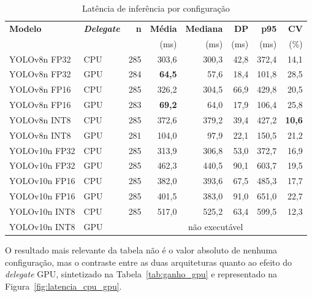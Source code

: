 \documentclass[artigo,times,capa]{iftex2024}
\begin{document}
\begin{table}[H]
\centering
\caption{Latência de inferência por configuração}
\label{tab:latencia_inferencia}
\small
\begin{tabular}{llrrrrrr}
\toprule
\textbf{Modelo} & \textbf{\textit{Delegate}} & \textbf{n} & \textbf{Média} & \textbf{Mediana} & \textbf{DP} & \textbf{p95} & \textbf{CV} \\
 &  &  & (ms) & (ms) & (ms) & (ms) & (\%) \\
\midrule
YOLOv8n \ac{FP32} & \ac{CPU} & 285 & 303,6 & 300,3 & 42,8 & 372,4 & 14,1 \\
YOLOv8n \ac{FP32} & \ac{GPU} & 284 & \textbf{64,5} & 57,6 & 18,4 & 101,8 & 28,5 \\
YOLOv8n \ac{FP16} & \ac{CPU} & 285 & 326,2 & 304,5 & 66,9 & 429,8 & 20,5 \\
YOLOv8n \ac{FP16} & \ac{GPU} & 283 & \textbf{69,2} & 64,0 & 17,9 & 106,4 & 25,8 \\
YOLOv8n \ac{INT8} & \ac{CPU} & 285 & 372,6 & 379,2 & 39,4 & 427,2 & \textbf{10,6} \\
YOLOv8n \ac{INT8} & \ac{GPU} & 281 & 104,0 & 97,9 & 22,1 & 150,5 & 21,2 \\
\midrule
YOLOv10n \ac{FP32} & \ac{CPU} & 285 & 313,9 & 306,8 & 53,0 & 372,7 & 16,9 \\
YOLOv10n \ac{FP32} & \ac{GPU} & 285 & 462,3 & 440,5 & 90,1 & 603,7 & 19,5 \\
YOLOv10n \ac{FP16} & \ac{CPU} & 285 & 382,0 & 393,6 & 67,5 & 485,3 & 17,7 \\
YOLOv10n \ac{FP16} & \ac{GPU} & 285 & 401,5 & 383,0 & 91,0 & 651,0 & 22,7 \\
YOLOv10n \ac{INT8} & \ac{CPU} & 285 & 517,0 & 525,2 & 63,4 & 599,5 & 12,3 \\
YOLOv10n \ac{INT8} & \ac{GPU} & \multicolumn{6}{c}{não executável} \\
\bottomrule
\end{tabular}
\end{table}

O resultado mais relevante da tabela não é o valor absoluto de nenhuma configuração, mas o contraste entre as duas arquiteturas quanto ao efeito do \textit{delegate} \ac{GPU}, sintetizado na Tabela~\ref{tab:ganho_gpu} e representado na Figura~\ref{fig:latencia_cpu_gpu}.
\end{document}
